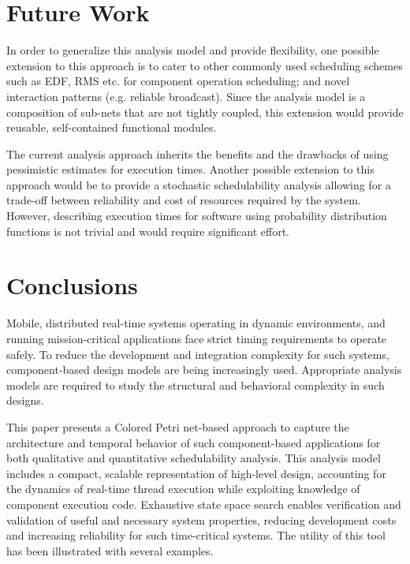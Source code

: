 \section{Future Work}
\label{sec:Future_Work}

In order to generalize this analysis model and provide flexibility, one possible extension to this approach is to cater to other commonly used scheduling schemes such as EDF, RMS etc. for component operation scheduling; and novel interaction patterns (e.g. reliable broadcast). Since the analysis model is a composition of sub-nets that are not tightly coupled, this extension would provide reusable, self-contained functional modules. 

The current analysis approach inherits the benefits and the drawbacks of using pessimistic estimates for execution times. Another possible extension to this approach would be to provide a stochastic schedulability analysis allowing for a trade-off between reliability and cost of resources required by the system. However, describing execution times for software using probability distribution functions is not trivial and would require significant effort.

\section{Conclusions}
\label{sec:Conclusions}

Mobile, distributed real-time systems operating in dynamic environments, and running mission-critical applications face strict timing requirements to operate safely. To reduce the development and integration complexity for such systems, component-based design models are being increasingly used. Appropriate analysis models are required to study the structural and behavioral complexity in such designs. 

This paper presents a Colored Petri net-based approach to capture the architecture and temporal behavior of such component-based applications for both qualitative and quantitative schedulability analysis. This analysis model includes a compact, scalable representation of high-level design, accounting for the dynamics of real-time thread execution while exploiting knowledge of component execution code. Exhaustive state space search enables verification and validation of useful and necessary system properties, reducing development costs and increasing reliability for such time-critical systems. The utility of this tool has been illustrated with several examples. 
